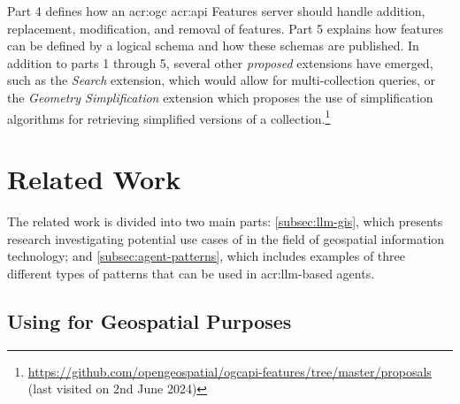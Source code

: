 Part 4 defines how an \acrshort{acr:ogc} \acrshort{acr:api} Features server should handle addition, replacement, modification, and removal of features. Part 5 explains how features can be defined by a logical schema and how these schemas are published. In addition to parts 1 through 5, several other \textit{proposed} extensions have emerged, such as the \textit{Search} extension, which would allow for multi-collection queries, or the \textit{Geometry Simplification} extension which proposes the use of simplification algorithms for retrieving simplified versions of a collection.\footnote{\url{https://github.com/opengeospatial/ogcapi-features/tree/master/proposals} (last visited on 2nd June 2024)}





\section{Related Work}
\label{sec:related-work}

The related work is divided into two main parts: \autoref{subsec:llm-gis}, which presents research investigating potential use cases of  in the field of geospatial information technology; and \autoref{subsec:agent-patterns}, which includes examples of three different types of patterns that can be used in \acrshort{acr:llm}-based agents.

\subsection[Using LLMs for Geospatial Purposes]{Using  for Geospatial Purposes}
\label{subsec:llm-gis}

